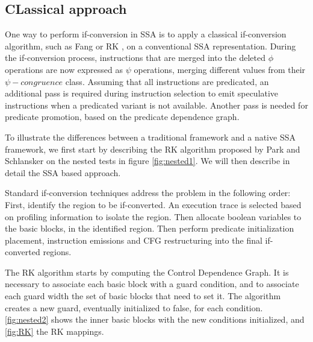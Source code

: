 \subsection{CLassical approach}

One way to perform if-conversion in SSA is to apply a classical if-conversion algorithm, such as Fang \cite{Fang:1996:CAI:645674.663446} or RK \cite{Schlansker-predicated}, on a conventional SSA representation. 
During the if-conversion process, instructions that are merged into the deleted $\phi$ operations are now expressed as $\psi$ operations, merging different values from their $\psi-congruence$ class. Assuming that all instructions are predicated, an additional pass is required during instruction selection to emit speculative instructions when a predicated variant is not available. Another pass is needed for predicate promotion, based on the predicate dependence graph.

To illustrate the differences between a traditional framework and a native SSA framework, we first start by describing the RK algorithm proposed by Park and Schlansker on the nested tests in figure \ref{fig:nested1}. We will then describe in detail the SSA based approach.

Standard if-conversion techniques address the problem in the following order: First, identify the region to be if-converted. An execution trace is selected based on profiling information to isolate the region. Then allocate boolean variables to the basic blocks, in the identified region. Then perform predicate initialization placement, instruction emissions and CFG restructuring into the final if-converted regions.

The RK algorithm starts by computing the Control Dependence Graph. It is necessary to associate each basic block with a guard condition, and to associate each guard width the set of basic blocks that need to set it. The algorithm creates a new guard, eventually initialized to false, for each condition. \ref{fig:nested2} shows the inner basic blocks with the new conditions initialized, and \ref{fig:RK} the RK mappings.

